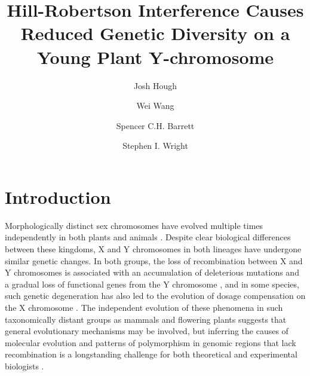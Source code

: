 \documentclass[9pt,twocolumn,twoside]{gsajnl}
\title{Hill-Robertson Interference Causes Reduced Genetic Diversity on a Young Plant Y-chromosome}
\author[$\ast$,$\dagger$,1]{Josh Hough}
\author[$\dagger$]{Wei Wang}
\author[$\dagger$]{Spencer C.H. Barrett}
\author[$\dagger$]{Stephen I. Wright}
\affil[$\ast$]{Department of Plant Sciences, University of California, Davis}
\affil[$\dagger$]{Department of Ecology and Evolutionary Biology, University of Toronto}
\begin{document}
\maketitle
\thispagestyle{firststyle}
\marginmark
\firstpagefootnote
{}
\vspace{-11pt}

\section*{Introduction}

\lettrine[lines=2]{\color{color2}M}{}orphologically distinct sex chromosomes have evolved multiple times independently in both plants and animals \citep{westergaard1958,ohno1967,bull1983,charlesworth1991,charlesworth2015plant}. Despite clear biological differences between these kingdoms, X and Y chromosomes in both lineages have undergone similar genetic changes. In both groups, the loss of recombination between X and Y chromosomes is associated with an accumulation of deleterious mutations and a gradual loss of functional genes from the Y chromosome \citep{bachtrog2013NRG,hough2014,bergero2015}, and in some species, such genetic degeneration has also led to the evolution of dosage compensation on the X chromosome \citep{charlesworth1996CB,muyle2012,mank2013sex,papadopulos2015}. The independent evolution of these phenomena in such taxonomically distant groups as mammals and flowering plants suggests that general evolutionary mechanisms may be involved, but inferring the causes of molecular evolution and patterns of polymorphism in genomic regions that lack recombination is a longstanding challenge for both theoretical and experimental biologists \citep{charlesworth1978,feldman1980evolution,barton1995general,charlesworth1996CB,otto1997deleterious,charlesworth2000degeneration,mcvean2000effects}.
\end{document}
